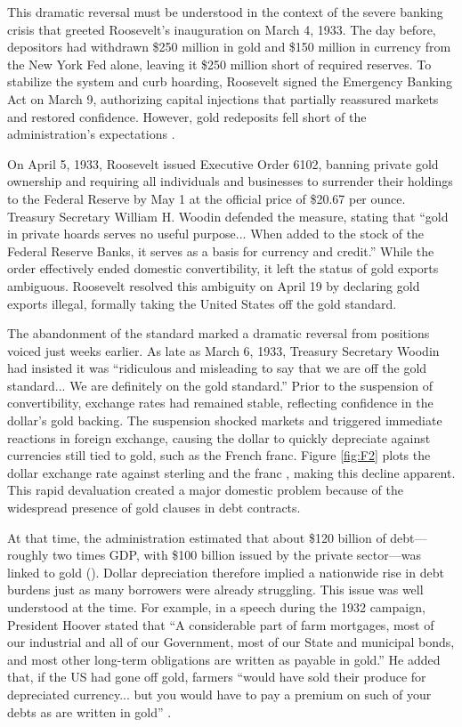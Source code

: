 This dramatic reversal must be understood in the context of the severe banking crisis that greeted Roosevelt's inauguration on March 4, 1933. The day before, depositors had withdrawn \$250 million in gold and \$150 million in currency from the New York Fed alone, leaving it \$250 million short of required reserves. To stabilize the system and curb hoarding, Roosevelt signed the Emergency Banking Act on March 9, authorizing capital injections that partially reassured markets and restored confidence. However, gold redeposits fell short of the administration's expectations \citep{Edwards2018}.

On April 5, 1933, Roosevelt issued Executive Order 6102, banning private gold ownership and requiring all individuals and businesses to surrender their holdings to the Federal Reserve by May 1 at the official price of \$20.67 per ounce. Treasury Secretary William H. Woodin defended the measure, stating that ``gold in private hoards serves no useful purpose... When added to the stock of the Federal Reserve Banks, it serves as a basis for currency and credit.'' While the order effectively ended domestic convertibility, it left the status of gold exports ambiguous. Roosevelt resolved this ambiguity on April 19 by declaring gold exports illegal, formally taking the United States off the gold standard.

The abandonment of the standard marked a dramatic reversal from positions voiced just weeks earlier. As late as March 6, 1933, Treasury Secretary Woodin had insisted it was ``ridiculous and misleading to say that we are off the gold standard... We are definitely on the gold standard.'' Prior to the suspension of convertibility, exchange rates had remained stable, reflecting confidence in the dollar's gold backing. The suspension shocked markets and triggered immediate reactions in foreign exchange, causing the dollar to quickly depreciate against currencies still tied to gold, such as the French franc. Figure \ref{fig:F2} plots the dollar exchange rate against sterling and the franc , making this decline apparent. This rapid devaluation created a major domestic problem because of the widespread presence of gold clauses in debt contracts.

At that time, the administration estimated that about \$120 billion of debt---roughly two times GDP, with \$100 billion issued by the private sector---was linked to gold (\cite{Edwards2015}). Dollar depreciation therefore implied a nationwide rise in debt burdens just as many borrowers were already struggling. This issue was well understood at the time. For example, in a speech during the 1932 campaign, President Hoover stated that ``A considerable part of farm mortgages, most of our industrial and all of our Government, most of our State and municipal bonds, and most other long-term obligations are written as payable in gold.'' He added that, if the US had gone off gold, farmers ``would have sold their produce for depreciated currency... but you would have to pay a premium on such of your debts as are written in gold'' \citep{Hoover1932}.


